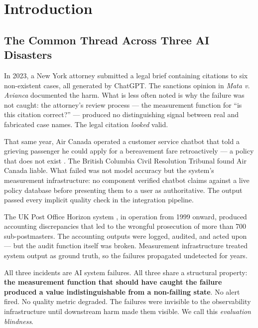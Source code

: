 \documentclass{article}
\begin{document}
\section{Introduction}
\label{sec:intro}

\subsection{The Common Thread Across Three AI Disasters}

In 2023, a New York attorney submitted a legal brief containing citations to six
non-existent cases, all generated by ChatGPT.  The sanctions opinion in
\emph{Mata v. Avianca} \citep{mata2023avianca} documented the harm.  What is
less often noted is why the failure was not caught: the attorney's review
process --- the measurement function for ``is this citation correct?'' ---
produced no distinguishing signal between real and fabricated case names.
The legal citation \emph{looked} valid.

That same year, Air Canada operated a customer service chatbot that told a
grieving passenger he could apply for a bereavement fare retroactively ---
a policy that does not exist \citep{aircanada2024chatbot}.  The British Columbia
Civil Resolution Tribunal found Air Canada liable.  What failed was not model
accuracy but the system's measurement infrastructure: no component verified
chatbot claims against a live policy database before presenting them to a user
as authoritative.  The output passed every implicit quality check in the
integration pipeline.

The UK Post Office Horizon system \citep{ukposthorizon2024}, in operation from
1999 onward, produced accounting discrepancies that led to the wrongful
prosecution of more than 700 sub-postmasters.  The accounting outputs were
logged, audited, and acted upon --- but the audit function itself was broken.
Measurement infrastructure treated system output as ground truth, so the
failures propagated undetected for years.

All three incidents are AI system failures.  All three share a structural
property: \textbf{the measurement function that should have caught the failure
produced a value indistinguishable from a non-failing state}.  No alert fired.
No quality metric degraded.  The failures were invisible to the observability
infrastructure until downstream harm made them visible.  We call this
\emph{evaluation blindness}.
\end{document}
